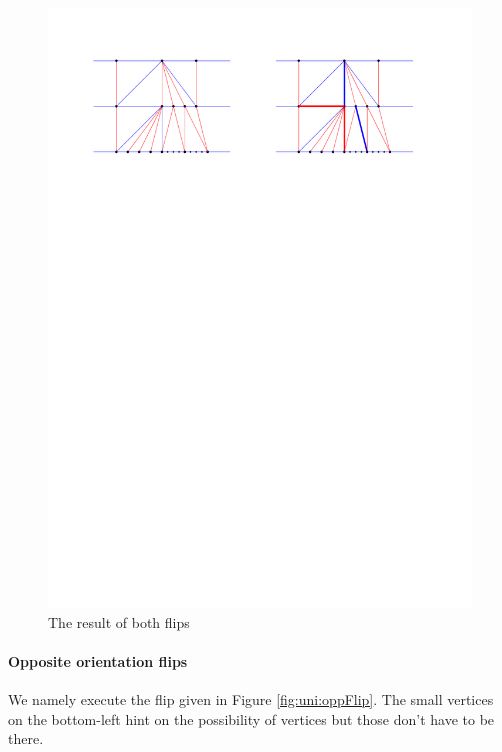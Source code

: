    \begin{figure}[h]
     \centering
     \includegraphics[width =\textwidth]{unifiedAlgo/img/post/sameFlipComplete}
     \caption{The result of both flips}
     \label{fig:uni:sameFlipComplete}
   \end{figure}



   \paragraph{Opposite orientation flips}
   We namely execute the flip given in Figure \ref{fig:uni:oppFlip}. The small vertices on the bottom-left hint on the possibility of vertices but those don't have to be there.

